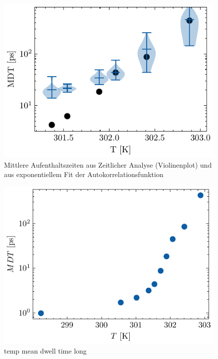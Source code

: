 \documentclass[main.tex]{subfiles}
\begin{document}
\begin{figure}[H]
    \centering
    \includegraphics{bilder/plots/temp_comparison/mean_dwell_time_comparison.pdf}
    \caption{Mittlere Aufenthaltszeiten aus Zeitlicher Analyse (Violinenplot) und aus exponentiellem Fit der Autokorrelationsfunktion }\label{fig:temp-mdt-comp}
\end{figure}


\begin{figure}[H]
    \centering
    \includegraphics{bilder/plots/temp_comparison_long/mean_dwell_time.pdf}
    \caption{temp mean dwell time long }\label{fig:temp-mdt-long}
\end{figure}
\end{document}
